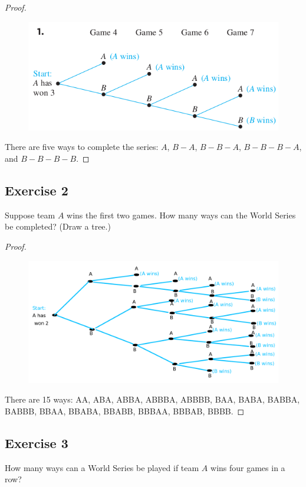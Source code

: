 \documentclass[14pt]{extarticle}
\begin{document}
\begin{proof}
     \begin{figure}[ht!]
          \centering
          \includegraphics[scale=0.43]{../images/9.2.1.png}
     \end{figure}

     There are five ways to complete the series: $A$, \(B-A\), \(B-B-A\), \(B-B-B-A\), and \(B-B-B-B\).
\end{proof}

\subsection{Exercise 2}
Suppose team $A$ wins the first two games. How many ways can the World Series be completed? (Draw a tree.)

\begin{proof}
     \begin{figure}[ht!]
          \centering
          \includegraphics[scale=0.25]{../images/9.2.2.png}
     \end{figure}

     There are 15 ways: AA, ABA, ABBA, ABBBA, ABBBB, BAA, BABA, BABBA, BABBB, BBAA, BBABA, BBABB, BBBAA, BBBAB, BBBB.
\end{proof}

\subsection{Exercise 3}
How many ways can a World Series be played if team $A$ wins four games in a row?
\end{document}
